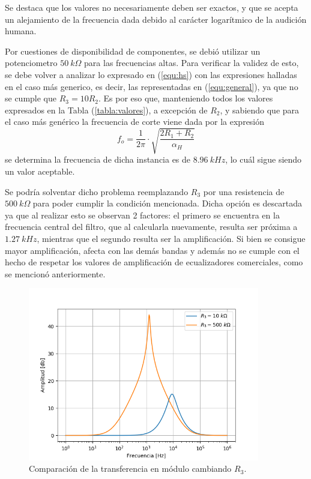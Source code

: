 \documentclass[a4paper]{article}
\begin{document}
Se destaca que los valores no necesariamente deben ser exactos, y que se acepta un alejamiento de la frecuencia dada debido al carácter logarítmico de la audición humana.

Por cuestiones de disponibilidad de componentes, se debió utilizar un potenciometro $50 \ k\Omega$ para las frecuencias altas. Para verificar la validez de esto, se debe volver a analizar lo expresado en (\ref{equ:hs}) con las expresiones halladas en el caso más generico, es decir, las representadas en (\ref{equ:general}), ya que no se cumple que $R_3 = 10R_2$. Es por eso que, manteniendo todos los valores expresados en la Tabla (\ref{tabla:valores}), a excepción de $R_2$, y sabiendo que para el caso más genérico la frecuencia de corte viene dada por la expresión
\begin{equation}
	f_o = \frac{1}{2\pi} \cdot \sqrt{\frac{2R_1 + R_2}{\alpha_H}}
	\label{equ:fogeneral}
\end{equation}
se determina la frecuencia de dicha instancia es de $8.96 \ kHz$, lo cuál sigue siendo un valor aceptable.

Se podría solventar dicho problema reemplazando $R_3$ por una resistencia de $500 \ k\Omega$ para poder cumplir la condición mencionada. Dicha opción es descartada ya que al realizar esto se observan 2 factores: el primero se encuentra en la frecuencia central del filtro, que al calcularla nuevamente, resulta ser próxima a $1.27 \ kHz$, mientras que el segundo resulta ser la amplificación. Si bien se consigue mayor amplificación, afecta con las demás bandas y además no se cumple con el hecho de respetar los valores de amplificación de ecualizadores comerciales, como se mencionó anteriormente.

\begin{figure}[H]
\centering
	\includegraphics[width=0.9\textwidth]{Imagenes/r3comp.png}
	\caption{Comparación de la transferencia en módulo cambiando $R_3$.}
	\label{fig:r3comp}
\end{figure}
\end{document}
